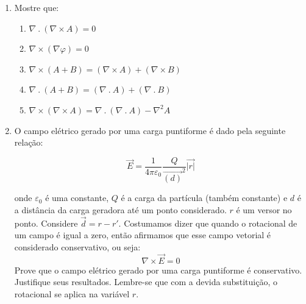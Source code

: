\documentclass[11pt,a4paper]{article}
\begin{document}
\begin{enumerate}
\begin{enumerate}
	\end{enumerate}
	
	\item Mostre que:
	
	\begin{enumerate}
	\item $\nabla \ . \ (\nabla \times A) = 0 $
	\item $\nabla \times (\nabla \varphi) = 0 $
	\item $\nabla \times (A + B) = (\nabla \times A) + (\nabla \times B)$
	\item $\nabla \ . \ (A + B) = (\nabla \ . \ A) + (\nabla \ . \ B)$
	\item $\nabla \times (\nabla \times A) = \nabla \ . \ (\nabla \ . \ A) - \nabla ^2 A $
	\end{enumerate}
	
	\item O campo elétrico gerado por uma carga puntiforme é dado pela seguinte relação:
	
	$$\vec{E} = \displaystyle\dfrac{1}{4 \pi \varepsilon_0} \displaystyle\dfrac{Q}{\vec{(d)}^2} \vec{|r|}$$
	
	onde $\varepsilon_0$ é uma constante, $Q$ é a carga da partícula (também constante) e $d$ é a distância da carga geradora até um ponto considerado. $r$ é um versor no ponto. Considere $\vec{d} = {r - r'}$. Costumamos dizer que  quando o rotacional de um campo é igual a zero, então afirmamos que esse campo vetorial é considerado conservativo, ou seja:
	$$\nabla \times \vec{E} = 0$$
	Prove que o campo elétrico gerado por uma carga puntiforme é conservativo. Justifique seus resultados. Lembre-se que com a devida substituição, o rotacional se aplica na variável $r$.
			
	\end{enumerate}
\end{document}
